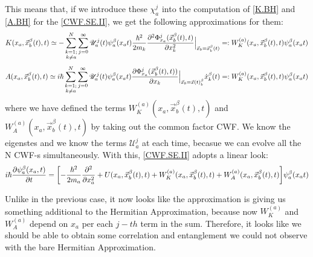\documentclass[11pt, a4paper]{article} %
\newcommand{\U}{\mathscr{U}}
\begin{document}
This means that, if we introduce these $\chi^j_a$ into the computation of \ref{K.BH} and \ref{A.BH} for the \ref{CWF.SE.II}, we get the following approximations for them:
$$
K(x_a, \vec{x}_b^\beta(t), t) \simeq - \sum_{\substack{k=1; \\ k\neq a}}^{N} \sum_{j=0}^\infty \U^j_a(t)\psi_a^\beta(x_a t) \frac{\hbar^2}{2m_k} \pdv[2]{ \Phi_{x_a}^j(\vec{x}_b^\beta(t),t)}{x_k}\Big\rvert_{\vec{x}_b=\vec{x}_b^\beta(t)}=:W_K^{(a)}(x_a, \vec{x}_b^\beta (t),t)\psi_a^\beta(x_a t)
$$
$$
A(x_a, \vec{x}_b^\beta(t), t) \simeq i \hbar \sum_{\substack{k=1; \\ k\neq a}}^{N} \sum_{j=0}^\infty \U^j_a(t)\psi_a^\beta(x_a t) \pdv{ \Phi_{x_a}^j(\vec{x}_b^\beta(t),t))}{x_k}\Big\rvert_{\vec{x}_b=\vec{x}(t)_b^\beta} \dot{x}_k^\beta(t)=:W_K^{(a)}(x_a, \vec{x}_b^\beta (t),t)\psi_a^\beta(x_a t)
$$
where we have defined the terms $W_K^{(a)}(x_a, \vec{x}_b^\beta (t),t)$ and $W_A^{(a)}(x_a, \vec{x}_b^\beta (t),t)$ by taking out the common factor CWF. We know the eigenstes and we know the terms $\U^j_a$ at each time, becasue we can evolve all the N CWF-s simultaneously. With this, \ref{CWF.SE.II} adopts a linear look:
$$
i\hbar \pdv{\psi_a^\beta(x_a, t)}{t} = \qty[- \frac{\hbar^2}{2m_a}\pdv[2]{}{x_a} + U(x_a, \vec{x}_b^\beta(t), t)+ W^{(a)}_K(x_a,\vec{x}_b^\beta (t),t) +W^{(a)}_A(x_a,\vec{x}_b^\beta (t),t) ]\psi_a^\beta(x_a t)
$$

Unlike in the previous case, it now looks like the approximation is giving us something additional to the Hermitian Approximation, because now $W^{(a)}_K$ and $W^{(a)}_A$ depend on $x_a$ per each $j-th$ term in the sum. Therefore, it looks like we should be able to obtain some correlation and entanglement we could not observe with the bare Hermitian Approximation.\\
\end{document}
